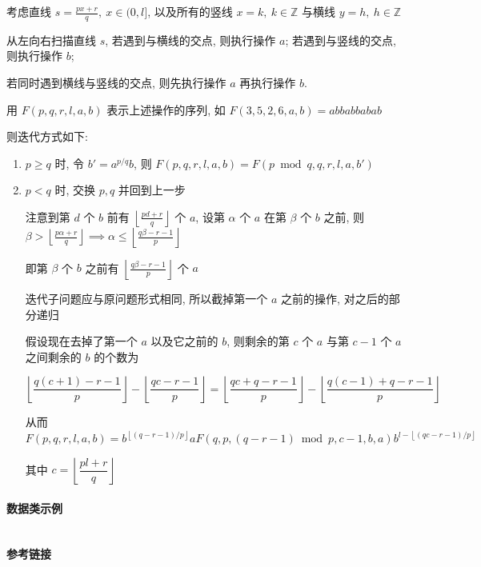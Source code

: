 考虑直线 \(s=\frac{px+r}{q},~x\in (0,l]\), 以及所有的竖线 \(x=k,~k\in\mathbb{Z}\) 与横线 \(y=h,~h\in\mathbb{Z}\)

从左向右扫描直线 \(s\), 若遇到与横线的交点, 则执行操作 \(a\); 若遇到与竖线的交点, 则执行操作 \(b\);

若同时遇到横线与竖线的交点, 则先执行操作 \(a\) 再执行操作 \(b\).

用 \(F(p,q,r,l,a,b)\) 表示上述操作的序列, 如 \(F(3,5,2,6,a,b)=abbabbabab\)

则迭代方式如下:

\begin{enumerate}
    \item \(p\geq q\) 时, 令 \(b'=a^{p/q}b\), 则 \(F(p,q,r,l,a,b)=F(p\bmod q,q,r,l,a,b')\)
    \item \(p<q\) 时, 交换 \(p,q\) 并回到上一步

          注意到第 \(d\) 个 \(b\) 前有 \(\left\lfloor\frac{pd+r}{q}\right\rfloor\) 个 \(a\), 设第 \(\alpha\) 个 \(a\) 在第 \(\beta\) 个 \(b\) 之前, 则 \(\displaystyle \beta > \left\lfloor\frac{p\alpha+r}{q}\right\rfloor \implies \alpha \leq \left\lfloor\frac{q\beta-r-1}{p}\right\rfloor\)

          即第 \(\beta\) 个 \(b\) 之前有 \(\left\lfloor\frac{q\beta-r-1}{p}\right\rfloor\) 个 \(a\)

          迭代子问题应与原问题形式相同, 所以截掉第一个 \(a\) 之前的操作, 对之后的部分递归

          假设现在去掉了第一个 \(a\) 以及它之前的 \(b\), 则剩余的第 \(c\) 个 \(a\) 与第 \(c-1\) 个 \(a\) 之间剩余的 \(b\) 的个数为

          \[
              \left\lfloor\frac{q(c+1)-r-1}{p}\right\rfloor-\left\lfloor\frac{qc-r-1}{p}\right\rfloor=\left\lfloor\frac{qc+q-r-1}{p}\right\rfloor-\left\lfloor\frac{q(c-1)+q-r-1}{p}\right\rfloor
          \]

          从而 \(\displaystyle F(p,q,r,l,a,b)=b^{\left\lfloor (q-r-1)/p \right\rfloor}aF(q,p,(q-r-1)\bmod p,c-1,b,a)b^{l-\left\lfloor (qc-r-1)/p \right\rfloor}\)

          其中 \(c=\left\lfloor\dfrac{pl+r}{q}\right\rfloor\)
\end{enumerate}

\paragraph{数据类示例}

\inputminted[firstline=2]{cpp}{src/math/exeuclid/node.cpp}

\paragraph{参考链接} 

